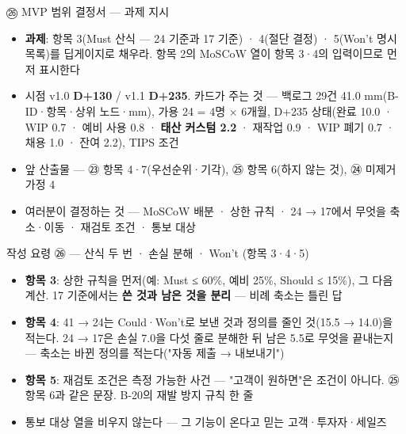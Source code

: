 \begin{frame}{㉖ MVP 범위 결정서 — 과제 지시}
\begin{itemize}
\item \textbf{과제}: 항목 3(Must 산식 — 24 기준과 17 기준) · 4(절단 결정) · 5(Won't 명시 목록)를 딥게이지로 채우라. 항목 2의 MoSCoW 열이 항목 3·4의 입력이므로 먼저 표시한다
\item 시점 v1.0 \textbf{D+130} / v1.1 \textbf{D+235}. 카드가 주는 것 — 백로그 29건 41.0 mm(B-ID·항목·상위 노드·mm), 가용 24 = 4명 × 6개월, D+235 상태(완료 10.0 · WIP 0.7 · 예비 사용 0.8 · \textbf{태산 커스텀 2.2} · 재작업 0.9 · WIP 폐기 0.7 · 채용 1.0 · 잔여 2.2), TIPS 조건
\item 앞 산출물 — ㉓ 항목 4·7(우선순위·기각), ㉕ 항목 6(하지 않는 것), ㉔ 미제거 가정 4
\item 여러분이 결정하는 것 — MoSCoW 배분 · 상한 규칙 · 24 → 17에서 무엇을 축소·이동 · 재검토 조건 · 통보 대상
\end{itemize}
\end{frame}

\begin{frame}{작성 요령 ㉖ — 산식 두 번 · 손실 분해 · Won't (항목 3·4·5)}
\begin{itemize}
\item \textbf{항목 3}: 상한 규칙을 먼저(예: Must ≤ 60\%, 예비 25\%, Should ≤ 15\%), 그 다음 계산. 17 기준에서는 \textbf{쓴 것과 남은 것을 분리} — 비례 축소는 틀린 답
\item \textbf{항목 4}: 41 → 24는 Could·Won't로 보낸 것과 정의를 줄인 것(15.5 → 14.0)을 적는다. 24 → 17은 손실 7.0을 다섯 줄로 분해한 뒤 남은 5.5로 무엇을 끝내는지 — 축소는 바뀐 정의를 적는다("자동 제출 → 내보내기")
\item \textbf{항목 5}: 재검토 조건은 측정 가능한 사건 — "고객이 원하면"은 조건이 아니다. ㉕ 항목 6과 같은 문장. B-20의 재발 방지 규칙 한 줄
\item 통보 대상 열을 비우지 않는다 — 그 기능이 온다고 믿는 고객·투자자·세일즈
\end{itemize}
\end{frame}

